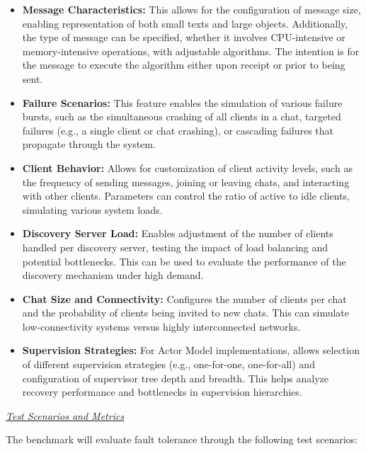 \begin{itemize}
    \item \textbf{Message Characteristics:} This allows for the configuration of message size, enabling representation of both small texts and large objects. Additionally, the type of message can be specified, whether it involves \gls{CPU}-intensive or memory-intensive operations, with adjustable algorithms. The intention is for the message to execute the algorithm either upon receipt or prior to being sent.

    \item \textbf{Failure Scenarios:} This feature enables the simulation of various failure bursts, such as the simultaneous crashing of all clients in a chat, targeted failures (e.g., a single client or chat crashing), or cascading failures that propagate through the system.

    \item \textbf{Client Behavior:} Allows for customization of client activity levels, such as the frequency of sending messages, joining or leaving chats, and interacting with other clients. Parameters can control the ratio of active to idle clients, simulating various system loads.

    \item \textbf{Discovery Server Load:} Enables adjustment of the number of clients handled per discovery server, testing the impact of load balancing and potential bottlenecks. This can be used to evaluate the performance of the discovery mechanism under high demand.

    \item \textbf{Chat Size and Connectivity:} Configures the number of clients per chat and the probability of clients being invited to new chats. This can simulate low-connectivity systems versus highly interconnected networks.

    \item \textbf{Supervision Strategies:} For Actor Model implementations, allows selection of different supervision strategies (e.g., one-for-one, one-for-all) and configuration of supervisor tree depth and breadth. This helps analyze recovery performance and bottlenecks in supervision hierarchies.

\end{itemize}

\textit{\underline{Test Scenarios and Metrics}}

The benchmark will evaluate fault tolerance through the following test scenarios:

